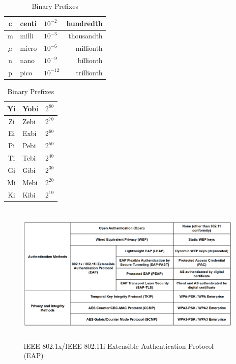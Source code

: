 \documentclass[12pt]{article}
\begin{document}
\begin{table}[H]
\begin{minipage}[t]{.45\linewidth}
\begin{tabular}{cllr}
	c 	& centi	& $10^{-2}$	& hundredth\\\hline
	m 	& milli	& $10^{-3}$	& thousandth\\\hline
	$\mu$ & micro	& $10^{-6}$	& millionth\\\hline
	n 	& nano	& $10^{-9}$	& billionth\\\hline
	p 	& pico	& $10^{-12}$	& trillionth\\\hline
	\end{tabular}
	\centering
	\caption{Binary Prefixes \label{tab:BINARY PREFIXES}}
	\begin{tabular}{cll}\hline
	Yi 	& Yobi	& $2^{80}$\\\hline
	Zi	& Zebi	& $2^{70}$\\\hline
	Ei	& Exbi	& $2^{60}$\\\hline
	Pi	& Pebi	& $2^{50}$\\\hline
	Ti 	& Tebi	& $2^{40}$\\\hline
	Gi	& Gibi	& $2^{30}$\\\hline
	Mi 	& Mebi	& $2^{20}$\\\hline
	Ki	& Kibi	& $2^{10}$\\\hline
	\end{tabular}\end{minipage}\end{table}

	\begin{figure}[H]
	\centering
	\caption{IEEE 802.1x/IEEE 802.11i Extensible Authentication Protocol (EAP) \label{fig:WIRELESS SECURITY}}
	\includegraphics[width=\textwidth,height=7cm]{Wireless_Security}
	\end{figure}


\end{document}
